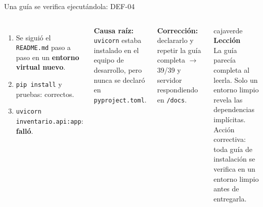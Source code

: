 \documentclass[aspectratio=169,11pt]{beamer}
\newcommand{\cod}[1]{\texttt{\small #1}}
\newcommand{\caja}[3]{\begin{beamercolorbox}[wd=\dimexpr\linewidth-12pt\relax,sep=6pt,rounded=true]{#1}#3\end{beamercolorbox}}
\begin{document}
\begin{frame}{Una guía se verifica ejecutándola: DEF-04}
\begin{columns}[c,onlytextwidth]
\begin{enumerate}\small
  \item Se siguió el \cod{README.md} paso a paso en un \textbf{entorno virtual nuevo}.
  \item \cod{pip install} y pruebas: correctos.
  \item \cod{uvicorn inventario.api:app}: \textbf{\color{rojo}falló}.
\end{enumerate}
\vspace{0.2cm}
\textbf{Causa raíz:} \cod{uvicorn} estaba instalado en el equipo de desarrollo, pero nunca se declaró en \cod{pyproject.toml}.
\vspace{0.2cm}

\textbf{Corrección:} declararlo y repetir la guía completa $\rightarrow$ 39/39 y servidor respondiendo en \cod{/docs}.
\caja{cajaverde}{}{\small
\textbf{Lección}\\[0.1cm]
La guía parecía completa al leerla. Solo un entorno limpio revela las dependencias implícitas.\\[0.15cm]
\footnotesize\color{gristexto}Acción correctiva: toda guía de instalación se verifica en un entorno limpio antes de entregarla.}
\end{columns}
\end{frame}
\end{document}
